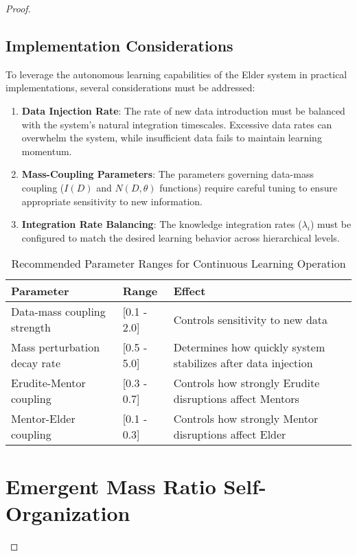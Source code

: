 \begin{proof}
\subsection{Implementation Considerations}

To leverage the autonomous learning capabilities of the Elder system in practical implementations, several considerations must be addressed:

\begin{enumerate}
    \item \textbf{Data Injection Rate}: The rate of new data introduction must be balanced with the system's natural integration timescales. Excessive data rates can overwhelm the system, while insufficient data fails to maintain learning momentum.
    
    \item \textbf{Mass-Coupling Parameters}: The parameters governing data-mass coupling ($I(D)$ and $N(D, \theta)$ functions) require careful tuning to ensure appropriate sensitivity to new information.
    
    \item \textbf{Integration Rate Balancing}: The knowledge integration rates ($\lambda_i$) must be configured to match the desired learning behavior across hierarchical levels.
\end{enumerate}

\begin{table}[h]
\centering
\caption{Recommended Parameter Ranges for Continuous Learning Operation}
\label{tab:parameter_ranges}
\begin{tabular}{p{4cm} p{3cm} p{7cm}}
\textbf{Parameter} & \textbf{Range} & \textbf{Effect} \\
\hline
Data-mass coupling strength & [0.1 - 2.0] & Controls sensitivity to new data \\
Mass perturbation decay rate & [0.5 - 5.0] & Determines how quickly system stabilizes after data injection \\
Erudite-Mentor coupling & [0.3 - 0.7] & Controls how strongly Erudite disruptions affect Mentors \\
Mentor-Elder coupling & [0.1 - 0.3] & Controls how strongly Mentor disruptions affect Elder \\
\hline
\end{tabular}
\end{table}

\section{Emergent Mass Ratio Self-Organization}


\end{proof}

